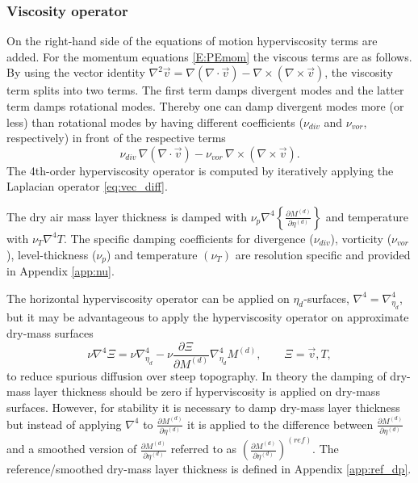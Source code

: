 \documentclass{agujournal}
\begin{document}
{\subsubsection{Viscosity operator}\label{sec:hyper}
On the right-hand side of the equations of motion hyperviscosity terms are added. For the momentum equations \eqref{E:PEmom} the viscous terms are as follows. By using the vector identity  $\nabla^2 \vec{v} = \nabla(\nabla \cdot \vec{v}) - \nabla \times (\nabla \times \vec{v}) $, the viscosity term splits into two terms. The first term damps divergent modes and the latter term damps rotational modes. Thereby one can damp divergent modes more (or less) than rotational modes by having different coefficients ($\nu_{div}$ and $\nu_{vor}$, respectively) in front of the respective terms
 \begin{equation}
  \nu_{div} \, \nabla(\nabla \cdot \vec{v}) -
   \nu_{vor} \,  \nabla \times (\nabla \times \vec{v}).\label{eq:vec_diff}
 \end{equation}
The 4th-order hyperviscosity operator is computed by iteratively applying the Laplacian operator \eqref{eq:vec_diff}. 

The dry air mass layer thickness is damped with $\nu_p \nabla^4\left\{ \frac{\partial M^{(d)}}{\partial \eta^{(d)}}\right\}$ and temperature with $\nu_T \nabla^4 T$. The specific damping coefficients for divergence ($\nu_{div}$), vorticity ($\nu_{vor}$), level-thickness ($\nu_p$) and temperature $(\nu_T)$ are resolution specific and provided in Appendix \ref{app:nu}.

The horizontal hyperviscosity operator can be applied on $\eta_d$-surfaces, $\nabla^4=\nabla^4_{\eta_d}$, but it may be advantageous to apply the hyperviscosity operator on approximate dry-mass surfaces
\begin{equation}
\nu \nabla^4 \Xi =\nu \nabla^4_{\eta_d}-\nu \frac{\partial \Xi\quad }{\partial M^{(d)}} \nabla^4_{\eta_d}M^{(d)},\qquad \Xi=\vec{v}, T,
\end{equation}
\citep[p.58 in ][]{CAM5} to reduce spurious diffusion over steep topography. In theory the damping of dry-mass layer thickness should be zero if hyperviscosity is applied on dry-mass surfaces. However, for stability it is necessary to damp dry-mass layer thickness but instead of applying $\nabla^4$ to $\frac{\partial M^{(d)}}{\partial \eta^{(d)}}$ it is applied to the difference between $\frac{\partial M^{(d)}}{\partial \eta^{(d)}}$ and a smoothed version of $\frac{\partial M^{(d)}}{\partial \eta^{(d)}}$ referred to as $\left( \frac{\partial M^{(d)}}{\partial \eta^{(d)}}\right)^{(ref)}$. The reference/smoothed dry-mass layer thickness is defined in Appendix \ref{app:ref_dp}. 

}
\end{document}
